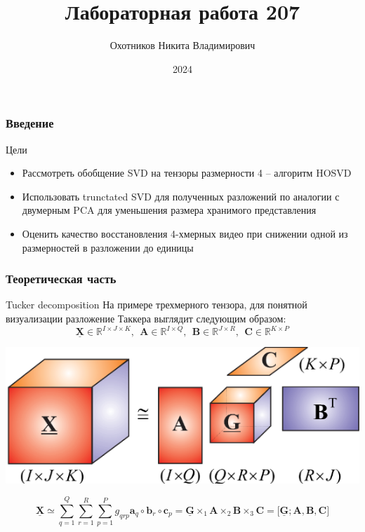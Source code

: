 \documentclass[10pt]{beamer}
\title[]{Лабораторная работа 207}
\author{Охотников Никита Владимирович}
\institute{МФТИ}
\date{2024}
\begin{document}
\begin{frame}
  \titlepage
\end{frame}


\begin{frame}
	\frametitle{Введение}
	\begin{block}{Цели}
		\begin{itemize}
			\item Рассмотреть обобщение SVD на тензоры размерности 4 -- алгоритм HOSVD
			\item Использовать trunctated SVD для полученных разложений по аналогии с двумерным PCA для уменьшения размера хранимого представления
			\item Оценить качество восстановления 4-хмерных видео при снижении одной из размерностей в разложении до единицы
		\end{itemize}
	\end{block}	
\end{frame}

\begin{frame}
	\frametitle{Теоретическая часть}
	\begin{block}{Tucker decomposition}
		На примере трехмерного тензора, для понятной визуализации разложение Таккера выглядит следующим образом:
		$$\mathbf{\underline{X}} \in \mathbb{R}^{I \times J \times K}, ~~\mathbf{A} \in \mathbb{R}^{I \times Q}, ~~\mathbf{B} \in \mathbb{R}^{J \times R}, ~~\mathbf{C} \in \mathbb{R}^{K \times P}$$
			\begin{center}
				\includegraphics[scale =0.65]{./tucker.png}
			\end{center}
		$$\mathbf{\underline{X}}\simeq \sum_{q=1}^{Q} \sum_{r=1}^{R} \sum_{p=1}^{P} g_{qrp} \mathbf{a}_q \circ \mathbf{b}_r \circ \mathbf{c}_p = \mathbf{\underline{G}} \times_1 \mathbf{A} \times_2 \mathbf{B} \times_3 \mathbf{C} = \Big[ \mathbf{\underline{G}};  \mathbf{A},  \mathbf{B}, \mathbf{C}   \Big]$$
	\end{block}	
\end{frame}
\end{document}
